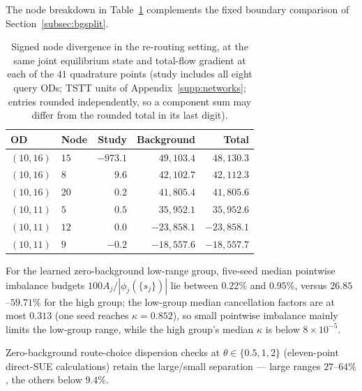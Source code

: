 The node breakdown in Table~\ref{tab:bgdecomp} complements the fixed
boundary comparison of Section~\ref{subsec:bgsplit}.
\begin{table}[pos=htbp]
\footnotesize
\caption{Signed node divergence in the re-routing setting, at the
same joint equilibrium state and total-flow gradient at each of the
$41$ quadrature points (study includes all eight query ODs; TSTT
units of Appendix~\ref{supp:networks}; entries rounded independently,
so a component sum may differ from the rounded total in its last
digit).}
\label{tab:bgdecomp}
\small
\begin{tabular*}{\tblwidth}{@{\extracolsep{\fill}}llrrr}
\toprule
OD & Node & Study & Background & Total\\
\midrule
$(10,16)$ & $15$ & $-973.1$ & $49,103.4$ & $48,130.3$ \\
$(10,16)$ & $8$ & $9.6$ & $42,102.7$ & $42,112.3$ \\
$(10,16)$ & $20$ & $0.2$ & $41,805.4$ & $41,805.6$ \\
$(10,11)$ & $5$ & $0.5$ & $35,952.1$ & $35,952.6$ \\
$(10,11)$ & $12$ & $0.0$ & $-23,858.1$ & $-23,858.1$ \\
$(10,11)$ & $9$ & $-0.2$ & $-18,557.6$ & $-18,557.7$ \\
\bottomrule
\end{tabular*}
\end{table}

For the learned zero-background low-range group, five-seed median pointwise
imbalance budgets $100A_j/|\phi_j(\{s_j\})|$ lie between $0.22\%$ and
$0.95\%$, versus $26.85$--$59.71\%$ for the high group; the low-group
median cancellation factors are at most $0.313$ (one seed reaches
$\kappa=0.852$), so small pointwise imbalance mainly limits the
low-group range, while the high group's median $\kappa$ is below
$8\times10^{-5}$.

Zero-background route-choice dispersion checks at $\theta\in\{0.5,1,2\}$
(eleven-point direct-SUE calculations) retain the large/small
separation --- large ranges $27$--$64\%$, the others below $9.4\%$.

